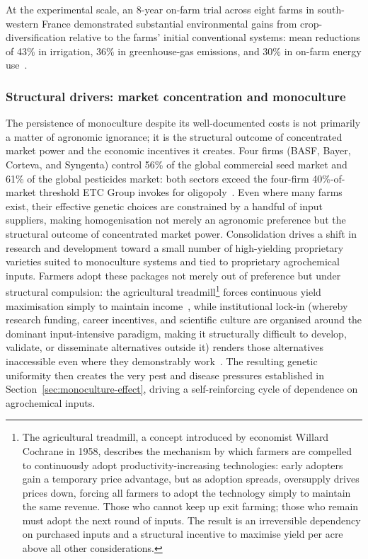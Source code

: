 At the experimental scale, an 8-year on-farm trial across eight farms in south-western France demonstrated substantial environmental gains from crop-diversification relative to the farms' initial conventional systems: mean reductions of 43\% in irrigation, 36\% in greenhouse-gas emissions, and 30\% in on-farm energy use~\cite[Abstract,~Section~3.2]{alletto2022irrigation}.


\subsubsection{Structural drivers: market concentration and monoculture}\label{sec:structural-drivers}

The persistence of monoculture despite its well-documented costs is not primarily a matter of agronomic ignorance; it is the structural outcome of concentrated market power and the economic incentives it creates. Four firms (BASF, Bayer, Corteva, and Syngenta) control 56\% of the global commercial seed market and 61\% of the global pesticides market: both sectors exceed the four-firm 40\%-of-market threshold ETC Group invokes for oligopoly~\cite[pp.~2,~4]{etcgroup2025agribusiness}. Even where many farms exist, their effective genetic choices are constrained by a handful of input suppliers, making homogenisation not merely an agronomic preference but the structural outcome of concentrated market power. Consolidation drives a shift in research and development toward a small number of high-yielding proprietary varieties suited to monoculture systems and tied to proprietary agrochemical inputs. Farmers adopt these packages not merely out of preference but under structural compulsion: the agricultural treadmill\footnote{The agricultural treadmill, a concept introduced by economist Willard Cochrane in 1958, describes the mechanism by which farmers are compelled to continuously adopt productivity-increasing technologies: early adopters gain a temporary price advantage, but as adoption spreads, oversupply drives prices down, forcing all farmers to adopt the technology simply to maintain the same revenue. Those who cannot keep up exit farming; those who remain must adopt the next round of inputs. The result is an irreversible dependency on purchased inputs and a structural incentive to maximise yield per acre above all other considerations.} forces continuous yield maximisation simply to maintain income~\cite[Chapter~5, pp.~95--96]{cochrane1958treadmill}, while institutional lock-in (whereby research funding, career incentives, and scientific culture are organised around the dominant input-intensive paradigm, making it structurally difficult to develop, validate, or disseminate alternatives outside it) renders those alternatives inaccessible even where they demonstrably work~\cite[Section~5, pp.~980--981]{vanloqueren2009lockout}. The resulting genetic uniformity then creates the very pest and disease pressures established in Section~\ref{sec:monoculture-effect}, driving a self-reinforcing cycle of dependence on agrochemical inputs.

